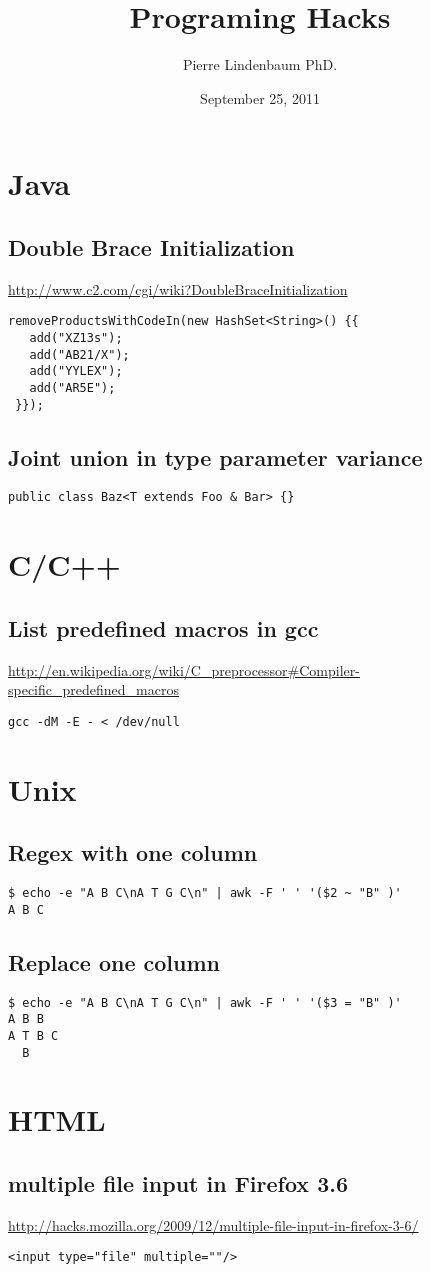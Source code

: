\documentclass[12pt]{article}
\title{Programing Hacks}
\author{Pierre Lindenbaum PhD.}
\date{September 25, 2011}
\begin{document}
\maketitle
\section{Java}
\subsection{Double Brace Initialization}
\url{http://www.c2.com/cgi/wiki?DoubleBraceInitialization}
\begin{verbatim}
removeProductsWithCodeIn(new HashSet<String>() {{
   add("XZ13s");
   add("AB21/X");
   add("YYLEX");
   add("AR5E");
 }});
\end{verbatim}
\subsection{Joint union in type parameter variance}
\begin{verbatim}
public class Baz<T extends Foo & Bar> {}
\end{verbatim}
\section{C/C++}
\subsection{List predefined macros in gcc}
\url{http://en.wikipedia.org/wiki/C_preprocessor#Compiler-specific_predefined_macros}
\begin{verbatim}
gcc -dM -E - < /dev/null
\end{verbatim}

\section{Unix}
\subsection{Regex with one column}
\begin{verbatim}
$ echo -e "A B C\nA T G C\n" | awk -F ' ' '($2 ~ "B" )'
A B C
\end{verbatim}
\subsection{Replace one column}
\begin{verbatim}
$ echo -e "A B C\nA T G C\n" | awk -F ' ' '($3 = "B" )'
A B B
A T B C
  B

\end{verbatim}
\section{HTML}
\subsection{multiple file input in Firefox 3.6}
\url{http://hacks.mozilla.org/2009/12/multiple-file-input-in-firefox-3-6/}
\begin{verbatim}
<input type="file" multiple=""/>
\end{verbatim}
\end{document}

